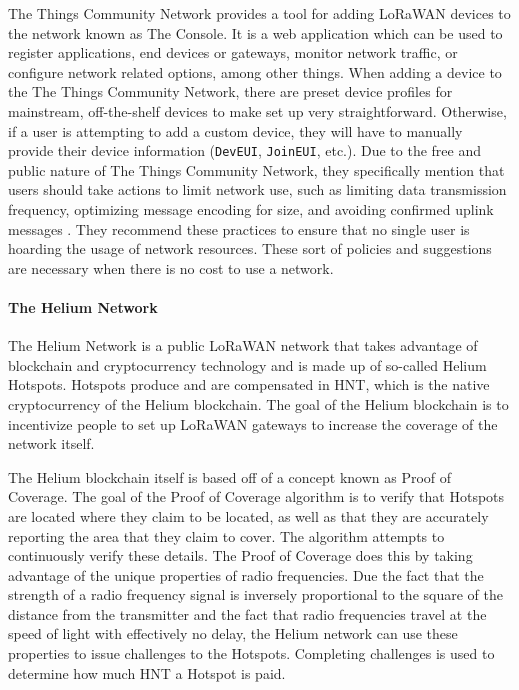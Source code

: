 The Things Community Network provides a tool for adding LoRaWAN devices to the network known as The Console. It is a web application which can be used to register applications, end devices or gateways, monitor network traffic, or configure network related options, among other things. When adding a device to the The Things Community Network, there are preset device profiles for mainstream, off-the-shelf devices to make set up very straightforward. Otherwise, if a user is attempting to add a custom device, they will have to manually provide their device information (\texttt{DevEUI}, \texttt{JoinEUI}, etc.). Due to the free and public nature of The Things Community Network, they specifically mention that users should take actions to limit network use, such as limiting data transmission frequency, optimizing message encoding for size, and avoiding confirmed uplink messages \cite{the-things-network}. They recommend these practices to ensure that no single user is hoarding the usage of network resources. These sort of policies and suggestions are necessary when there is no cost to use a network.

\paragraph{The Helium Network}
The Helium Network is a public LoRaWAN network that takes advantage of blockchain and cryptocurrency technology and is made up of so-called Helium Hotspots. Hotspots produce and are compensated in HNT, which is the native cryptocurrency of the Helium blockchain. The goal of the Helium blockchain is to incentivize people to set up LoRaWAN gateways to increase the coverage of the network itself.

The Helium blockchain itself is based off of a concept known as Proof of Coverage. The goal of the Proof of Coverage algorithm is to verify that Hotspots are located where they claim to be located, as well as that they are accurately reporting the area that they claim to cover. The algorithm attempts to continuously verify these details. The Proof of Coverage does this by taking advantage of the unique properties of radio frequencies. Due the fact that the strength of a radio frequency signal is inversely proportional to the square of the distance from the transmitter and the fact that radio frequencies travel at the speed of light with effectively no delay, the Helium network can use these properties to issue challenges to the Hotspots. Completing challenges is used to determine how much HNT a Hotspot is paid.

